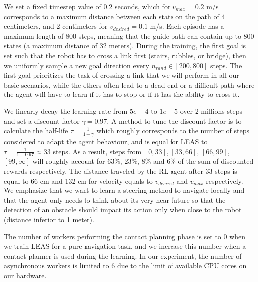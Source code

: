 We set a fixed timestep value of $0.2$ seconds, which for $v_{max}=0.2$ m/s corresponds to a maximum distance between each state on the path of 4 centimeters, and 2 centimeters for $v_{desired}=0.1$ m/s.
Each episode has a maximum length of $800$ steps, meaning that the guide path can contain up to $800$ states (a maximum distance of 32 meters). During the training, the first goal is set such that the robot has to cross a link first (stairs, rubbles, or bridge), then we uniformly sample a new goal direction every $n_{rand} \in [200,800]$ steps. The first goal prioritizes the task of crossing a link that we will perform in all our basic scenarios, while the others often lead to a dead-end or a difficult path where the agent will have to learn if it has to stop or if it has the ability to cross it.

We linearly decay the learning rate from $5e-4$ to $1e-5$ over 2 millions steps and set a discount factor $\gamma = 0.97$. 
A method to tune the discount factor is to calculate the half-life $\tau = \frac{1}{1-\gamma}$ which roughly corresponds to the number of steps considered to adapt the agent behaviour, and is equal for LEAS to $\tau = \frac{1}{1-0.97} \approx 33$ steps. 
As a result, steps from $[0,33]$, $[33,66]$, $[66,99]$, $[99,\infty]$ will roughly account for $63\%$, $23\%$, $8\%$ and $6\%$ of the sum of discounted rewards respectively. 
The distance traveled by the RL agent after 33 steps is equal to 66 cm and 132 cm for velocity equals to $v_{desired}$ and $v_{max}$ respectively.
We emphasize that we want to learn a steering method to navigate locally and that the agent only needs to think about its very near future so that the detection of an obstacle should impact its action only when close to the robot (distance inferior to 1 meter).

The number of workers performing the contact planning phase is set to 0 when we train LEAS for a pure navigation task, and we increase this number when a contact planner is used during the learning. In our experiment, the number of asynchronous workers is limited to 6 due to the limit of available CPU cores on our hardware.

